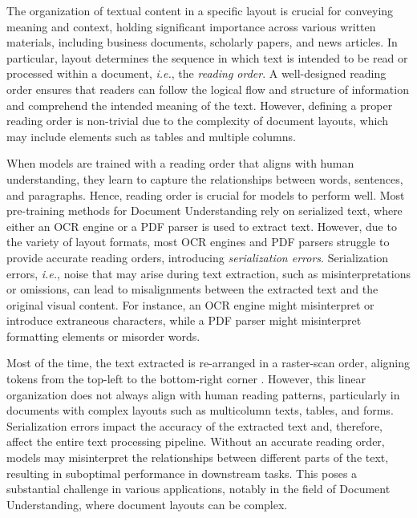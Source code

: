 
The organization of textual content in a specific layout is crucial for conveying meaning and context, holding significant importance across various written materials, including business documents, scholarly papers, and news articles. In particular, layout determines the sequence in which text is intended to be read or processed within a document, \textit{i.e.}, the \textit{reading order}. A well-designed reading order ensures that readers can follow the logical flow and structure of information and comprehend the intended meaning of the text. However, defining a proper reading order is non-trivial due to the complexity of document layouts, which may include elements such as tables and multiple columns.

When models are trained with a reading order that aligns with human understanding, they learn to capture the relationships between words, sentences, and paragraphs. Hence, reading order is crucial for models to perform well. Most pre-training methods for Document Understanding rely on serialized text, where either an \ac{OCR} engine or a PDF parser is used to extract text. However, due to the variety of layout formats, most \ac{OCR} engines and PDF parsers struggle to provide accurate reading orders, introducing \textit{serialization errors}. Serialization errors, \textit{i.e.}, noise that may arise during text extraction, such as misinterpretations or omissions, can lead to misalignments between the extracted text and the original visual content. For instance, an \ac{OCR} engine might misinterpret or introduce extraneous characters, while a PDF parser might misinterpret formatting elements or misorder words. 

Most of the time, the text extracted is re-arranged in a raster-scan order, aligning tokens from the top-left to the bottom-right corner \citep{clausner2013significance}. However, this linear organization does not always align with human reading patterns, particularly in documents with complex layouts such as multicolumn texts, tables, and forms. Serialization errors impact the accuracy of the extracted text and, therefore, affect the entire text processing pipeline. Without an accurate reading order, models may misinterpret the relationships between different parts of the text, resulting in suboptimal performance in downstream tasks. This poses a substantial challenge in various applications, notably in the field of Document Understanding, where document layouts can be complex. 

